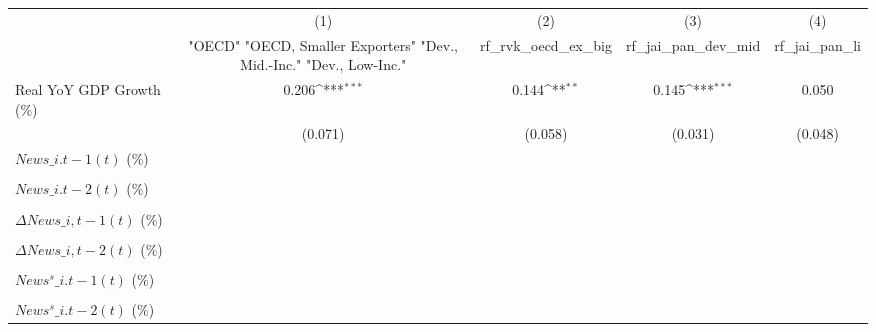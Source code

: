 {
\def\sym#1{\ifmmode^{#1}\else\(^{#1}\)\fi}
\begin{tabular}{l*{4}{c}}
\toprule
                    &\multicolumn{1}{c}{(1)}&\multicolumn{1}{c}{(2)}&\multicolumn{1}{c}{(3)}&\multicolumn{1}{c}{(4)}\\
                    &\multicolumn{1}{c}{ "OECD" "OECD, Smaller Exporters" "Dev., Mid.-Inc." "Dev., Low-Inc."}&\multicolumn{1}{c}{rf\_rvk\_oecd\_ex\_big}&\multicolumn{1}{c}{rf\_jai\_pan\_dev\_mid}&\multicolumn{1}{c}{rf\_jai\_pan\_li}\\
\midrule
Real YoY GDP Growth (\%)&       0.206\sym{***}&       0.144\sym{**} &       0.145\sym{***}&       0.050         \\
                    &     (0.071)         &     (0.058)         &     (0.031)         &     (0.048)         \\
\addlinespace
$ News\_{i.t-1}(t)$ (\%)&                     &                     &                     &                     \\
                    &                     &                     &                     &                     \\
\addlinespace
$ News\_{i.t-2}(t)$ (\%)&                     &                     &                     &                     \\
                    &                     &                     &                     &                     \\
\addlinespace
$ \Delta News\_{i,t-1}(t)$ (\%)&                     &                     &                     &                     \\
                    &                     &                     &                     &                     \\
\addlinespace
$ \Delta News\_{i,t-2}(t)$ (\%)&                     &                     &                     &                     \\
                    &                     &                     &                     &                     \\
\addlinespace
$ News^s\_{i.t-1}(t)$ (\%)&                     &                     &                     &                     \\
                    &                     &                     &                     &                     \\
\addlinespace
$ News^s\_{i.t-2}(t)$ (\%)&                     &                     &                     &                     \\

\end{tabular}}
